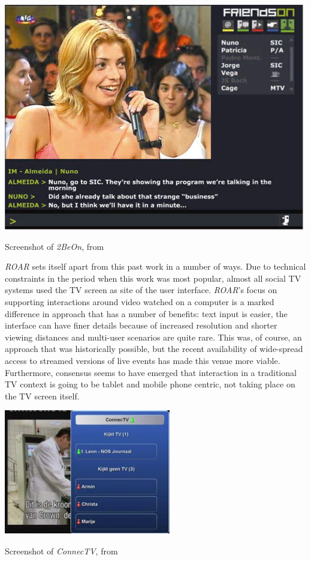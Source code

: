 \begin{marginfigure}
	\includegraphics{figures/roar/2BeOn.png}
	\caption{Screenshot of \emph{2BeOn}, from \citep{abreu20022beon}}
	\label{fig:2beon}
\end{marginfigure}


\emph{ROAR} sets itself apart from this past work in a number of ways. Due to technical constraints in the period when this work was most popular, almost all social TV systems used the TV screen as site of the user interface. \emph{ROAR}'s focus on supporting interactions around video watched on a computer is a marked difference in approach that has a number of benefits: text input is easier, the interface can have finer details because of increased resolution and shorter viewing distances and multi-user scenarios are quite rare. This was, of course, an approach that was historically possible, but the recent availability of wide-spread access to streamed versions of live events has made this venue more viable. Furthermore, consensus seems to have emerged that interaction in a traditional TV context is going to be tablet and mobile phone centric, not taking place on the TV screen itself.

\begin{marginfigure}
	\includegraphics{figures/roar/connectv.png}
	\caption{Screenshot of \emph{ConnecTV}, from \citep{boertjes2008connectv}}
	\label{fig:connectv}
\end{marginfigure}



